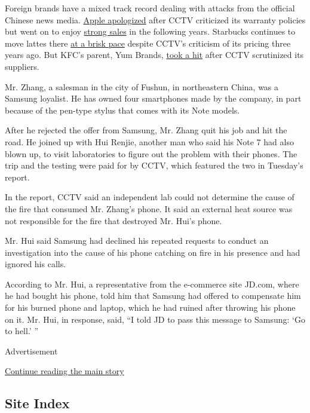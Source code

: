 Foreign brands have a mixed track record dealing with attacks from the
official Chinese news media.
\href{http://www.nytimes3xbfgragh.onion/2013/04/02/technology/apples-chief-tim-cook-apologizes-to-china-over-warranty-policy.html}{Apple
apologized} after CCTV criticized its warranty policies but went on to
enjoy
\href{http://www.nytimes3xbfgragh.onion/2015/08/25/technology/tim-cook-of-apple-seeks-to-quell-china-fears-in-email-to-jim-cramer.html}{strong
sales} in the following years. Starbucks continues to move lattes there
\href{http://sinosphere.blogs.nytimes3xbfgragh.onion/2013/10/21/state-media-call-starbucks-too-pricey/}{at
a brisk pace} despite CCTV's criticism of its pricing three years ago.
But KFC's parent, Yum Brands,
\href{http://www.nytimes3xbfgragh.onion/2013/02/06/business/global/kfc-parent-suffers-after-china-scandal.html}{took
a hit} after CCTV scrutinized its suppliers.

Mr. Zhang, a salesman in the city of Fushun, in northeastern China, was
a Samsung loyalist. He has owned four smartphones made by the company,
in part because of the pen-type stylus that comes with its Note models.

After he rejected the offer from Samsung, Mr. Zhang quit his job and hit
the road. He joined up with Hui Renjie, another man who said his Note 7
had also blown up, to visit laboratories to figure out the problem with
their phones. The trip and the testing were paid for by CCTV, which
featured the two in Tuesday's report.

In the report, CCTV said an independent lab could not determine the
cause of the fire that consumed Mr. Zhang's phone. It said an external
heat source was not responsible for the fire that destroyed Mr. Hui's
phone.

Mr. Hui said Samsung had declined his repeated requests to conduct an
investigation into the cause of his phone catching on fire in his
presence and had ignored his calls.

According to Mr. Hui, a representative from the e-commerce site JD.com,
where he had bought his phone, told him that Samsung had offered to
compensate him for his burned phone and laptop, which he had ruined
after throwing his phone on it. Mr. Hui, in response, said, ``I told JD
to pass this message to Samsung: `Go to hell.' ''

Advertisement

\protect\hyperlink{after-bottom}{Continue reading the main story}

\hypertarget{site-index}{%
\subsection{Site Index}\label{site-index}}

